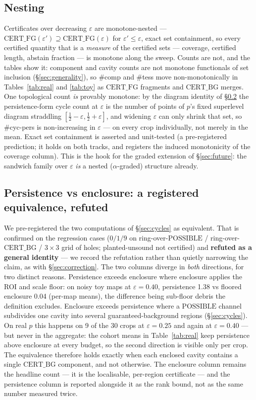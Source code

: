 \documentclass[10pt]{article}
\newcommand{\CFG}{\mathrm{CERT\_FG}}
\newcommand{\CBG}{\mathrm{CERT\_BG}}
\newcommand{\POSS}{\mathrm{POSSIBLE}}
\newcommand{\eps}{\varepsilon}
\begin{document}
\subsection{Nesting}\label{sec:nesting}
Certificates over decreasing $\eps$ are monotone-nested ---
$\CFG(\eps') \supseteq \CFG(\eps)$ for $\eps' \le \eps$, exact set
containment, so every certified quantity that is a \emph{measure} of the
certified sets --- coverage, certified length, abstain fraction --- is
monotone along the sweep. Counts are not, and the tables show it:
component and cavity counts are not monotone functionals of set inclusion
(\S\ref{sec:generality}), so \#comp and \#tess move non-monotonically in
Tables~\ref{tab:real} and \ref{tab:toy} as $\CFG$ fragments and $\CBG$
merges. One topological count \emph{is} provably monotone: by the diagram
identity of \S\ref{sec:hc4} the persistence-form cycle count at $\eps$ is
the number of points of $p$'s fixed superlevel diagram straddling
$[\tfrac12-\eps, \tfrac12+\eps]$, and widening $\eps$ can only shrink
that set, so \#cyc-pers is non-increasing in $\eps$ --- on every crop
individually, not merely in the mean. Exact set containment is asserted
and unit-tested (a pre-registered prediction; it holds on both tracks, and
registers the induced monotonicity of the coverage column). This is the hook for the graded extension of
\S\ref{sec:future}: the sandwich family over $\eps$ \emph{is} a nested
($\alpha$-graded) structure already.

\subsection{Persistence vs enclosure: a registered equivalence,
refuted}\label{sec:hc4}
We pre-registered the two computations of \S\ref{sec:cycles} as
equivalent. That is confirmed on the regression cases ($0/1/9$ on
ring-over-$\POSS$ / ring-over-$\CBG$ / $3\times 3$ grid of holes;
planted-unsound not certified) and \textbf{refuted as a general
identity} --- we record the refutation rather than quietly narrowing the
claim, as with \S\ref{sec:correction}. The two columns diverge in
\emph{both} directions, for two distinct reasons. Persistence exceeds
enclosure where enclosure applies the ROI and scale floor: on noisy toy
maps at $\eps=0.40$, persistence 1.38 vs floored enclosure 0.04 (per-map
means), the difference being sub-floor debris the definition excludes.
Enclosure exceeds persistence where a $\POSS$ channel subdivides one
cavity into several guaranteed-background regions
(\S\ref{sec:cycles}). On real $p$ this happens on 9 of the 30 crops at
$\eps=0.25$ and again at $\eps=0.40$ --- but never in the aggregate: the
cohort means in Table~\ref{tab:real} keep persistence above enclosure at
every budget, so the second direction is visible only per crop. The
equivalence therefore holds exactly when each enclosed cavity contains a
single $\CBG$ component, and not otherwise. The enclosure column remains
the headline count --- it is the localisable, per-region certificate ---
and the persistence column is reported alongside it as the rank bound,
not as the same number measured twice.
\end{document}
